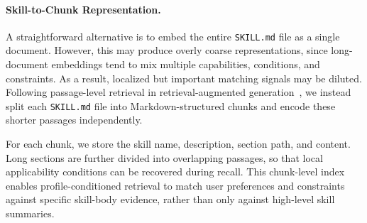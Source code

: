 \documentclass[letterpaper]{article} %
\begin{document}
\paragraph{Skill-to-Chunk Representation.}
A straightforward alternative is to embed the entire \texttt{SKILL.md} file as a single document.
However, this may produce overly coarse representations, since long-document embeddings tend to mix multiple capabilities, conditions, and constraints.
As a result, localized but important matching signals may be diluted.
Following passage-level retrieval in retrieval-augmented generation~\citep{lewis2020rag}, we instead split each \texttt{SKILL.md} file into Markdown-structured chunks and encode these shorter passages independently.


For each chunk, we store the skill name, description, section path, and content.
Long sections are further divided into overlapping passages, so that local applicability conditions can be recovered during recall.
This chunk-level index enables profile-conditioned retrieval to match user preferences and constraints against specific skill-body evidence, rather than only against high-level skill summaries.
\end{document}
